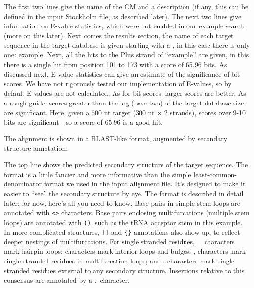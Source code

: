 The first two lines give the name of the CM and a description (if any,
this can be defined in the input Stockholm file, as described later).
The next two lines give information on E-value statistics, which were
not enabled in our example search (more on this later).  Next comes
the results section, the name of each target sequence in the target
database is given starting with a \prog{$>$}, in this case there is only one:
example. Next, all the hits to the Plus strand of ``example'' are
given, in this there is a single hit from position 101 to 173 with a
score of 65.96 bits. As discussed next, E-value statistics can give an
estimate of the significance of bit scores. We have not rigorously
tested our implementation of E-values, so by default E-values are not
calculated. As for bit scores, larger scores are better. As a rough
guide, scores greater than the log (base two) of the target database
size are significant.  Here, given a 600 nt target (300 nt $\times$ 2
strands), scores over 9-10 bits are significant - so a score of 65.96
is a good hit.


The alignment is shown in a BLAST-like format, augmented by secondary
structure annotation. 

The top line shows the predicted secondary structure of the target
sequence. The format is a little fancier and more informative than the
simple least-common-denominator format we used in the input alignment
file. It's designed to make it easier to ``see'' the secondary
structure by eye. The format is described in detail later; for now,
here's all you need to know. Base pairs in simple stem loops are
annotated with \verb+<>+ characters. Base pairs enclosing
multifurcations (multiple stem loops) are annotated with \verb+()+,
such as the tRNA acceptor stem in this example. In more complicated
structures, \verb+[]+ and \verb+{}+ annotations also show up, to
reflect deeper nestings of multifurcations. For single stranded
residues, \_ characters mark hairpin loops; \- characters mark
interior loops and bulges; , characters mark single-stranded residues
in multifurcation loops; and : characters mark single stranded
residues external to any secondary structure. Insertions relative to
this consensus are annotated by a \verb+.+ character.

